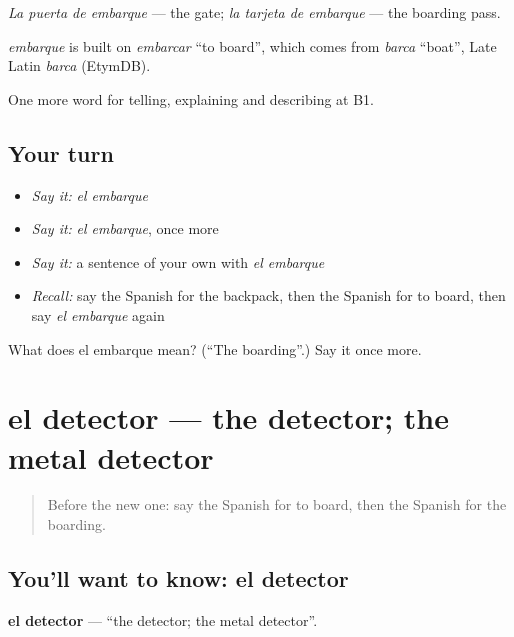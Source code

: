 \emph{La puerta de embarque} — the gate; \emph{la tarjeta de embarque} — the boarding pass.

\begin{cousinweb}
\emph{embarque} is built on \emph{embarcar} \textquotedblleft{}to board\textquotedblright{}, which comes from \emph{barca} \textquotedblleft{}boat\textquotedblright{}, Late Latin \emph{barca} (EtymDB).
\end{cousinweb}

\begin{grammarlens}[title={What you've built}]
One more word for telling, explaining and describing at B1.
\end{grammarlens}

\subsection*{Your turn}
\begin{itemize}
\raggedright
  \item \emph{Say it:} \emph{el embarque}
  \item \emph{Say it:} \emph{el embarque}, once more
  \item \emph{Say it:} a sentence of your own with \emph{el embarque}
  \item \emph{Recall:} say the Spanish for the backpack, then the Spanish for to board, then say \emph{el embarque} again
\end{itemize}

\begin{tcolorbox}[breakable,colback=teal!4,colframe=teal!35!black,title={Before you move on}]
What does el embarque mean? (\textquotedblleft{}The boarding\textquotedblright{}.) Say it once more.
\end{tcolorbox}
\section[el detector]{el detector — the detector; the metal detector}

\label{lesson:ES-C653-detector}



\begin{quote}
Before the new one: say the Spanish for to board, then the Spanish for the boarding.
\end{quote}

\subsection*{You'll want to know: el detector}
\textbf{el detector} — \textquotedblleft{}the detector; the metal detector\textquotedblright{}.

